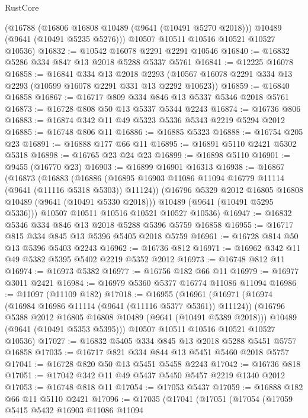 \begin{lexlean}{RustCore}
\begin{coremodule}
      (@16788
        (@16806 @16808 @10489 (@9641 (@10491 @5270 @2018)))
        @10489
        (@9641 (@10491 @5235 @5276)))
      @10507
      @10511
      @10516
      @10521
      @10527
      @10536)
@16832 := @10542 @16078 @2291 @2291 @10546
@16840 := @16832 @5286 @334 @847 @13 @2018 @5288 @5337 @5761
@16841 := @12225 @16078
@16858 := @16841
    @334
    @13
    @2018
    @2293
    (@10567 @16078 @2291 @334 @13 @2293 (@10599 @16078 @2291 @331 @13 @2292 @10623))
@16859 := @16840 @16858
@16867 := @16717 @809 @334 @846 @13 @5337 @5346 @2018 @5761
@16873 := @16728 @808 @50 @13 @5337 @5344 @2243
@16874 := @16736 @806
@16883 := @16874 @342 @11 @49 @5323 @5336 @5343 @2219 @5294 @2012
@16885 := @16748 @806 @11
@16886 := @16885 @5323
@16888 := @16754 @205 @23
@16891 := @16888 @177 @66 @11
@16895 := @16891 @5110 @2421 @5302 @5318
@16898 := @16765 @23 @24 @23
@16899 := @16898 @5110
@16901 := @9455 (@16770 @23)
@16903 := @16899 @16901 @16313
@16938 := @16867
    (@16873
      (@16883
        (@16886 (@16895 @16903 @11086 @11094 @16779 @11114 (@9641 (@11116 @5318 @5303)) @11124))
        (@16796 @5329 @2012 @16805 @16808 @10489 (@9641 (@10491 @5330 @2018)))
        @10489
        (@9641 (@10491 @5295 @5336)))
      @10507
      @10511
      @10516
      @10521
      @10527
      @10536)
@16947 := @16832 @5346 @334 @846 @13 @2018 @5288 @5396 @5759 @16858
@16955 := @16717 @815 @334 @845 @13 @5396 @5405 @2018 @5759
@16961 := @16728 @814 @50 @13 @5396 @5403 @2243
@16962 := @16736 @812
@16971 := @16962 @342 @11 @49 @5382 @5395 @5402 @2219 @5352 @2012
@16973 := @16748 @812 @11
@16974 := @16973 @5382
@16977 := @16756 @182 @66 @11
@16979 := @16977 @3011 @2421
@16984 := @16979 @5360 @5377 @16774 @11086 @11094
@16986 := @11097 (@11109 @182)
@17018 := @16955
    (@16961
      (@16971
        (@16974 (@16984 @16986 @11114 (@9641 (@11116 @5377 @5361)) @11124))
        (@16796 @5388 @2012 @16805 @16808 @10489 (@9641 (@10491 @5389 @2018)))
        @10489
        (@9641 (@10491 @5353 @5395)))
      @10507
      @10511
      @10516
      @10521
      @10527
      @10536)
@17027 := @16832 @5405 @334 @845 @13 @2018 @5288 @5451 @5757 @16858
@17035 := @16717 @821 @334 @844 @13 @5451 @5460 @2018 @5757
@17041 := @16728 @820 @50 @13 @5451 @5458 @2243
@17042 := @16736 @818
@17051 := @17042 @342 @11 @49 @5437 @5450 @5457 @2219 @1340 @2012
@17053 := @16748 @818 @11
@17054 := @17053 @5437
@17059 := @16888 @182 @66 @11 @5110 @2421
@17096 := @17035
    (@17041
      (@17051
        (@17054
          (@17059
            @5415
            @5432
            @16903
            @11086
            @11094

\end{coremodule}
\end{lexlean}
